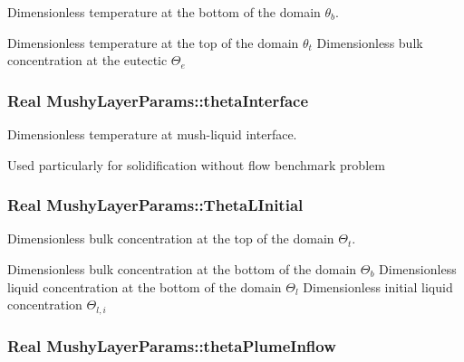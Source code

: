 Dimensionless temperature at the bottom of the domain $ \theta_b $. 

Dimensionless temperature at the top of the domain $ \theta_t $ Dimensionless bulk concentration at the eutectic $ \Theta_e $ \hypertarget{class_mushy_layer_params_a4f5bbe8dd1098ccc6bac03fce6b6bfa0}{
\subsubsection[{theta\-Interface}]{\setlength{\rightskip}{0pt plus 5cm}Real Mushy\-Layer\-Params\-::theta\-Interface}}\label{class_mushy_layer_params_a4f5bbe8dd1098ccc6bac03fce6b6bfa0}


Dimensionless temperature at mush-\/liquid interface. 

Used particularly for solidification without flow benchmark problem \hypertarget{class_mushy_layer_params_a3781f0d56c7054c5f28a7004324a0891}{
\subsubsection[{Theta\-L\-Initial}]{\setlength{\rightskip}{0pt plus 5cm}Real Mushy\-Layer\-Params\-::\-Theta\-L\-Initial}}\label{class_mushy_layer_params_a3781f0d56c7054c5f28a7004324a0891}


Dimensionless bulk concentration at the top of the domain $ \Theta_t $. 

Dimensionless bulk concentration at the bottom of the domain $ \Theta_b $ Dimensionless liquid concentration at the bottom of the domain $ \Theta_l $ Dimensionless initial liquid concentration $ \Theta_{l,i} $ \hypertarget{class_mushy_layer_params_abd2acb1163b9a8660abea009ecbc2a09}{
\subsubsection[{theta\-Plume\-Inflow}]{\setlength{\rightskip}{0pt plus 5cm}Real Mushy\-Layer\-Params\-::theta\-Plume\-Inflow}}\label{class_mushy_layer_params_abd2acb1163b9a8660abea009ecbc2a09}


